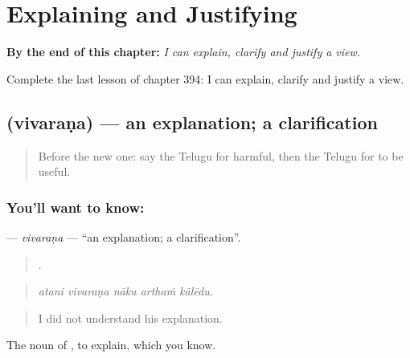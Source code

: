 
\chapter{Explaining and Justifying}
\label{ch:te-explaining-and-justifying}

\begin{chapteropening}
\textbf{By the end of this chapter:} \emph{I can explain, clarify and justify a view.}

Complete the last lesson of chapter 394: I can explain, clarify and justify a view.
\end{chapteropening}

\section[\texorpdfstring{\te{వివరణ} (vivaraṇa)}{వివరణ (vivaraṇa)}]{ (vivaraṇa) — an explanation; a clarification}

\label{lesson:TE-C394-vivarana}



\begin{quote}
Before the new one: say the Telugu for harmful, then the Telugu for to be useful.
\end{quote}

\subsection*{You'll want to know: }
\textbf{} — \emph{vivaraṇa} — \textquotedblleft{}an explanation; a clarification\textquotedblright{}.

\begin{quote}
    .
\end{quote}

\begin{quote}
\emph{atani vivaraṇa nāku arthaṁ kālēdu.}
\end{quote}

\begin{quote}
I did not understand his explanation.
\end{quote}

The noun of , to explain, which you know.


